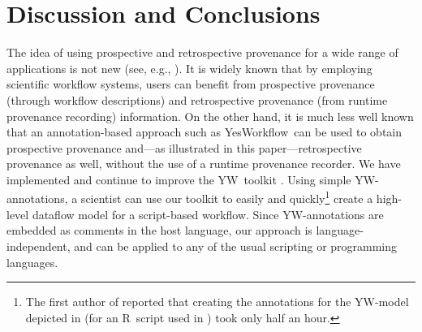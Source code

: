 \documentclass[letterpaper,twocolumn,10pt]{article}
\newcommand{\figref}[1]{Fig.\,\ref{#1}}
\newcommand{\code}[1]{\ensuremath{\mathtt{#1}}}
\newcommand{\YW}{\textsf{YesWorkflow}}
\newcommand{\yw}{\textsf{YW}}
\newcommand{\R}{\textsf{R}}
\begin{document}





\section{Discussion and Conclusions} 
\label{sec:discussion}

The idea of using prospective and retrospective provenance for a wide
range of applications is not new (see, e.g.,
\cite{zhao2006applying,missier2008data,frew2008automatic}).  It is
widely known that by employing scientific workflow systems, users can
benefit from prospective provenance (through workflow descriptions)
and retrospective provenance (from runtime provenance recording)
information. On the other hand, it is much less well known that an
annotation-based approach such as \YW\ can be used to obtain
prospective provenance and---as illustrated in this
paper---retrospective provenance as well, without the use of a runtime
provenance recorder.  We have implemented and continue to improve the
\yw\ toolkit \cite{mcphillips2015ywIJDC,yw-website}. Using simple
\yw-annotations, a scientist can use our toolkit to easily and
quickly\footnote{The first author of \cite{bocinsky2014} reported that
  creating the annotations for the \yw-model depicted in
  \cite{mcphillips2015ywIJDC} (for an \R\ script used in
  \cite{bocinsky2014}) took only half an hour.}  create a high-level
dataflow model for a script-based workflow.  Since \yw-annotations are
embedded as comments in the host language, our approach is
language-independent, and can be applied to any of the usual scripting
or programming languages.
\end{document}
